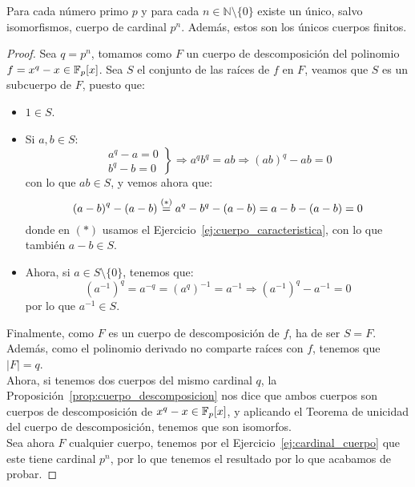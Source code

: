 \begin{teo}
    Para cada número primo $p$ y para cada $n\in \mathbb{N}\setminus\{0\}$ existe un único, salvo isomorfismos, cuerpo de cardinal $p^n$. Además, estos son los únicos cuerpos finitos.
    \begin{proof}
        Sea $q=p^n$, tomamos como $F$ un cuerpo de descomposición del polinomio $f=x^q-x\in \mathbb{F}_p[x]$. Sea $S$ el conjunto de las raíces de $f$ en $F$, veamos que $S$ es un subcuerpo de $F$, puesto que:
        \begin{itemize}
            \item $1\in S$.
            \item Si $a,b\in S$:
                \begin{equation*}
                    \left.\begin{array}{l}
                        a^q - a = 0 \\
                        b^q - b = 0 
                    \end{array}\right\} \Longrightarrow a^qb^q = ab \Longrightarrow {(ab)}^{q}-ab = 0
                \end{equation*}
                con lo que $ab\in S$, y vemos ahora que:
                \begin{equation*}
                    {(a-b)}^{q}-(a-b) \stackrel{(\ast)}{=} a^q - b^q - (a-b) = a-b-(a-b) = 0
                \end{equation*}
                donde en $(\ast)$ usamos el Ejercicio~\ref{ej:cuerpo_caracteristica}, con lo que también $a-b\in S$.
            \item Ahora, si $a\in S\setminus\{0\}$, tenemos que:
                \begin{equation*}
                    {(a^{-1})}^{q} = a^{-q} = {(a^{q})}^{-1} = a^{-1} \Longrightarrow {(a^{-1})}^{q}-a^{-1} = 0
                \end{equation*}
                por lo que $a^{-1}\in S$.
        \end{itemize}
        Finalmente, como $F$ es un cuerpo de descomposición de $f$, ha de ser $S = F$. Además, como el polinomio derivado no comparte raíces con $f$, tenemos que $|F| = q$.\\

        \noindent
    Ahora, si tenemos dos cuerpos del mismo cardinal $q$, la Proposición~\ref{prop:cuerpo_descomposicion} nos dice que ambos cuerpos son cuerpos de descomposición de $x^q-x\in \mathbb{F}_p[x]$, y aplicando el Teorema de unicidad del cuerpo de descomposición, tenemos que son isomorfos.\\

    \noindent
    Sea ahora $F$ cualquier cuerpo, tenemos por el Ejercicio~\ref{ej:cardinal_cuerpo} que este tiene cardinal $p^n$, por lo que tenemos el resultado por lo que acabamos de probar.
    \end{proof}
\end{teo}

